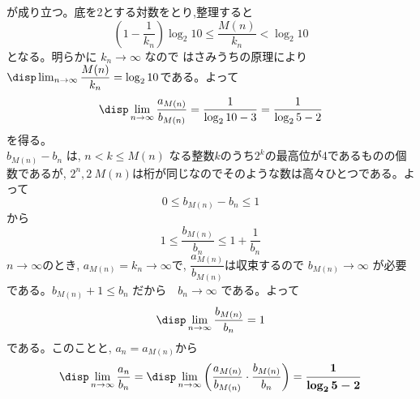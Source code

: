 が成り立つ。底を2とする対数をとり,整理すると
\[\left(1- \dfrac{1}{k_n}\right)\log_2{10}\leq \dfrac{M(n)}{k_n} < \log_2{10} \]
となる。明らかに $k_n\to \infty$ なので はさみうちの原理により$\disp\lim_{n\to \infty} \dfrac{M(n)}{k_n}=\log_2{10}$である。よって
\[\disp\lim_{n\to \infty}\dfrac{a_{M(n)}}{b_{M(n)}}=\dfrac{1}{\log_2{10}-3}=\dfrac{1}{\log_2{5}-2}\]
を得る。\\
$b_{M(n)}-b_n$ は, $ n< k\leq M(n)$ なる整数$k$のうち$2^k$の最高位が4であるものの個数であるが, $2^n, 2~{M(n)}$は桁が同じなのでそのような数は高々ひとつである。よって
\[0\leq b_{M(n)}-b_n\leq 1\]
から
\[1\leq \dfrac{b_{M(n)}}{b_{n}}\leq 1+\dfrac{1}{b_n}\]
$n\to \infty$のとき, $a_{M(n)}=k_n\to \infty$で, $\dfrac{a_{M(n)}}{b_{M(n)}}$は収束するので $b_{M(n)}\to \infty$ が必要である。$b_{M(n)}+1\leq b_n$ だから　$b_n\to \infty$ である。よって
\[\disp\lim_{n\to \infty} \dfrac{b_{M(n)}}{b_n}=1\]
である。このことと, $a_n=a_{M(n)}$から
\[\disp\lim_{n\to \infty}\dfrac{a_n}{b_n}=\disp\lim_{n\to \infty} \left(\dfrac{a_{M(n)}}{b_{M(n)}}\cdot \dfrac{b_{M(n)}}{b_n}\right) = \mbox{{\boldmath $\dfrac{1}{\log_2{5}-2}$}}\]
